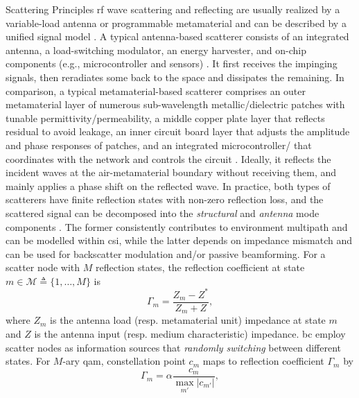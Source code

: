 \documentclass[journal]{IEEEtran}
\begin{document}
\begin{section}{Scattering Principles}
	\gls{rf} wave scattering and reflecting are usually realized by a {variable-load antenna} or {programmable metamaterial} and can be described by a unified signal model \cite{Liang2022}.
	A typical antenna-based scatterer consists of an integrated antenna, a load-switching modulator, an energy harvester, and on-chip components (e.g., microcontroller and sensors) \cite{Dobkin2012}.
	It first receives the impinging signals, then reradiates some back to the space and dissipates the remaining.
	In comparison, a typical metamaterial-based scatterer comprises an outer metamaterial layer of numerous sub-wavelength metallic/dielectric patches with tunable permittivity/permeability, a middle copper plate layer that reflects residual to avoid leakage, an inner circuit board layer that adjusts the amplitude and phase responses of patches, and an integrated microcontroller/ that coordinates with the network and controls the circuit \cite{Wu2020}.
	Ideally, it reflects the incident waves at the air-metamaterial boundary without receiving them, and mainly applies a phase shift on the reflected wave.
	In practice, both types of scatterers have finite reflection states with non-zero reflection loss, and the scattered signal can be decomposed into the \emph{structural} and \emph{antenna} mode components \cite{Hansen1989}.
	The former consistently contributes to environment multipath and can be modelled within \gls{csi}, while the latter depends on impedance mismatch and can be used for backscatter modulation and/or passive beamforming.
	For a scatter node with $M$ reflection states, the reflection coefficient at state $m \in \mathcal{M} \triangleq \{1,\ldots,M\}$ is
	\begin{equation}
		\Gamma_m = \frac{Z_m - Z^*}{Z_m + Z},
		\label{eq:reflection_coefficient}
	\end{equation}
	where $Z_m$ is the antenna load (resp. metamaterial unit) impedance at state $m$ and $Z$ is the antenna input (resp. medium characteristic) impedance.
	\gls{bc} employ scatter nodes as information sources that \emph{randomly switching} between different states.
	For $M$-ary \gls{qam}, constellation point $c_m$ maps to reflection coefficient $\Gamma_m$ by \cite{Thomas2012a}
	\begin{equation}
		\Gamma_m = \alpha \frac{c_m}{\max_{m'} \lvert c_{m'} \rvert},
		\label{eq:backscatter_modulation}

\end{equation}
\end{section}
\end{document}
